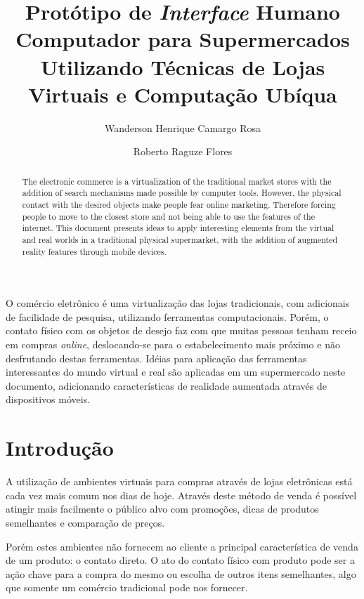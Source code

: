 \documentclass{article}
\title{Protótipo de \emph{Interface} Humano Computador para Supermercados
Utilizando Técnicas de Lojas Virtuais e Computação Ubíqua}
\author{Wanderson Henrique Camargo Rosa\inst{1} \and Roberto Raguze
Flores\inst{1}}
\begin{document}
\maketitle{}

\begin{abstract}
The electronic commerce is a virtualization of the traditional market stores
with the addition of search mechanisms made possible by computer tools. However,
the physical contact with the desired objects make people fear online marketing.
Therefore forcing people to move to the closest store and not being able to use
the features of the internet. This document presents ideas to apply interesting
elements from the virtual and real worlds in a traditional physical supermarket,
with the addition of augmented reality features through mobile devices.
\end{abstract}

\begin{resumo}
O comércio eletrônico é uma virtualização das lojas tradicionais, com adicionais
de facilidade de pesquisa, utilizando ferramentas computacionais. Porém, o
contato físico com os objetos de desejo faz com que muitas pessoas tenham receio
em compras \emph{online}, deslocando-se para o estabelecimento mais próximo e
não desfrutando destas ferramentas. Idéias para aplicação das ferramentas
interessantes do mundo virtual e real são aplicadas em um supermercado neste
documento, adicionando características de realidade aumentada através de
dispositivos móveis.
\end{resumo}

\section{Introdução}
\label{sec:introducao}


A utilização de ambientes virtuais para compras através de lojas eletrônicas
está cada vez mais comum nos dias de hoje. Através deste método de venda é
possível atingir mais facilmente o público alvo com promoções, dicas de produtos
semelhantes e comparação de preços.


Porém estes ambientes não fornecem ao cliente a principal característica de
venda de um produto: o contato direto. O ato do contato físico com produto pode
ser a ação chave para a compra do mesmo ou escolha de outros itens semelhantes,
algo que somente um comércio tradicional pode nos fornecer.
\end{document}
